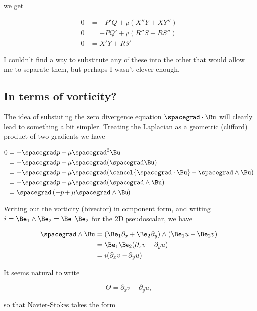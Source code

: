 we get

\begin{align}\label{eqn:nsVorticity:70}
0 &= -P' Q + \mu (X'' Y + X Y'') \\
0 &= -P Q' + \mu (R'' S + R S'') \\
0 &= X' Y + R S'
\end{align}

I couldn't find a way to substitute any of these into the other that would allow me to separate them, but perhaps I wasn't clever enough.  

\subsection{In terms of vorticity?}

The idea of substuting the zero divergence equation $\spacegrad \cdot \Bu$ will clearly lead to something a bit simpler.  Treating the Laplacian as a geometric (clifford) product of two gradients we have

\begin{align*}
0 
&= -\spacegrad p + \mu \spacegrad^2 \Bu \\
&= -\spacegrad p + \mu \spacegrad ( \spacegrad \Bu ) \\
&= -\spacegrad p + \mu \spacegrad ( \cancel{\spacegrad \cdot \Bu} + \spacegrad \wedge \Bu ) \\
&= -\spacegrad p + \mu \spacegrad ( \spacegrad \wedge \Bu ) \\
&= \spacegrad \left( -p + \mu \spacegrad \wedge \Bu \right)
\end{align*}

Writing out the vorticity (bivector) in component form, and writing $i = \Be_1 \wedge \Be_2 = \Be_1 \Be_2$ for the 2D pseudoscalar, we have

\begin{align*}
\spacegrad \wedge \Bu 
&= (\Be_1 \partial_x + \Be_2 \partial_y) \wedge (\Be_1 u + \Be_2 v) \\
&= \Be_1 \Be_2 (\partial_x v - \partial_y u ) \\
&= i (\partial_x v - \partial_y u )
\end{align*}

It seems natural to write

\begin{equation}\label{eqn:inclinedFlowWithoutConstantHeightAssumption:90}
\Theta = \partial_x v - \partial_y u,
\end{equation}

so that Navier-Stokes takes the form

